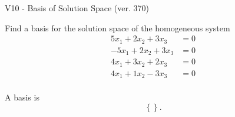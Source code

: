 \begin{exercise}
  \begin{exerciseTitle}V10 - Basis of Solution Space (ver. 370)\end{exerciseTitle}
  \begin{exerciseStatement}
    Find a basis for the solution space of the homogeneous system 
\begin{align*}
 5 x_ 1 + 2 x_ 2 + 3 x_ 3 &= 0  \\ 
  -5 x_ 1 + 2 x_ 2 + 3 x_ 3 &= 0  \\ 
  4 x_ 1 + 3 x_ 2 + 2 x_ 3 &= 0  \\ 
  4 x_ 1 + 1 x_ 2 -3 x_ 3 &= 0  \\ 
 \end{align*}


 
  \end{exerciseStatement}

  \begin{exerciseAnswer}
   A basis is   
\[\left\{\right\}.\]

  


  \end{exerciseAnswer}
\end{exercise}